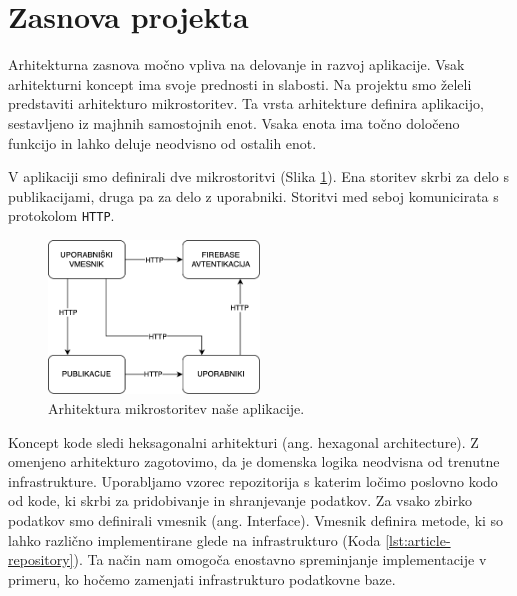 
\section{Zasnova projekta}
Arhitekturna zasnova močno vpliva na delovanje in razvoj aplikacije. Vsak arhitekturni koncept ima svoje prednosti in slabosti. Na projektu smo želeli predstaviti arhitekturo mikrostoritev. Ta vrsta arhitekture definira aplikacijo, sestavljeno iz majhnih samostojnih enot. Vsaka enota ima točno določeno funkcijo in lahko deluje neodvisno od ostalih enot.

V aplikaciji smo definirali dve mikrostoritvi (Slika \ref{app-architecture}). Ena storitev skrbi za delo s publikacijami, druga pa za delo z uporabniki. Storitvi med seboj komunicirata s protokolom \verb=HTTP=.

\begin{figure}[h]
\begin{center}
\includegraphics[width=0.5\textwidth]{slike/arhitecture.png}
\end{center}
\caption{ Arhitektura mikrostoritev naše aplikacije. }
\label{app-architecture}
\end{figure}



Koncept kode sledi heksagonalni arhitekturi (ang. hexagonal architecture). Z omenjeno arhitekturo zagotovimo, da je domenska logika neodvisna od trenutne infrastrukture. Uporabljamo vzorec repozitorija s katerim ločimo poslovno kodo od kode, ki skrbi za pridobivanje in shranjevanje podatkov. Za vsako zbirko podatkov smo definirali vmesnik (ang. Interface). Vmesnik definira metode, ki so lahko različno implementirane glede na infrastrukturo (Koda \ref{lst:article-repository}). Ta način nam omogoča enostavno spreminjanje implementacije v primeru, ko hočemo zamenjati infrastrukturo podatkovne baze.

